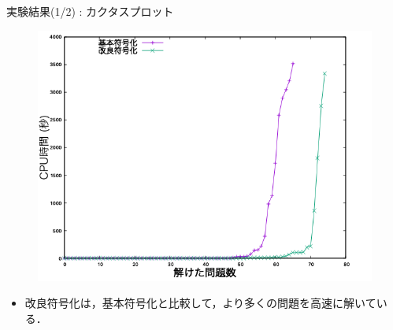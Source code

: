 \documentclass[dvipdfmx,11pt]{beamer}
\begin{document}
\begin{frame}{実験結果(1/2) : カクタスプロット}
 \begin{figure}[h]
  \centering
  \includegraphics[scale=0.38]{fig/cactus.png}
 \end{figure}

\begin{itemize}
 \item 改良符号化は，基本符号化と比較して，より多くの問題を高速に解いている．
\end{itemize}
\end{frame}
\end{document}
